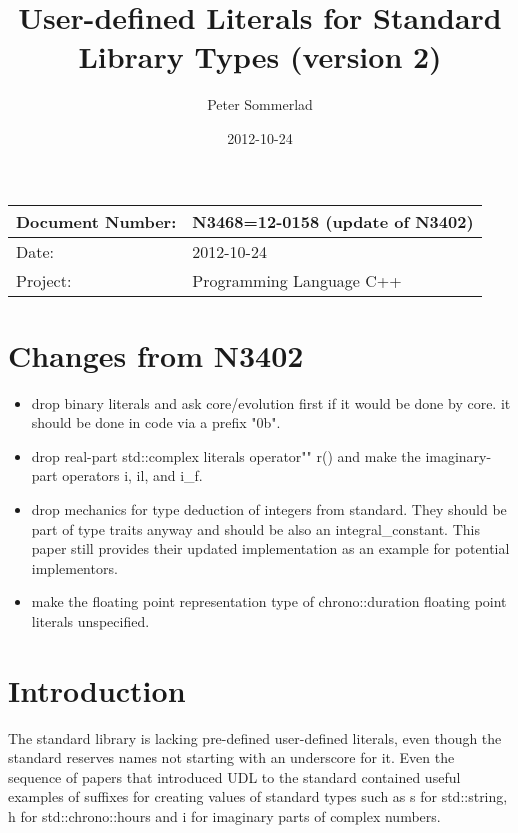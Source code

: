 \documentclass[ebook,11pt,article]{memoir}
\title{User-defined Literals for Standard Library Types (version 2)}
\author{Peter Sommerlad}
\date{2012-10-24}                                           %
\begin{document}
\maketitle
\begin{tabular}[t]{|l|l|}\hline 
Document Number: &  N3468=12-0158 (update of N3402)\\\hline
Date: & 2012-10-24 \\\hline
Project: & Programming Language C++\\\hline 
\end{tabular}

\chapter{Changes from N3402}
\begin{itemize}
\item drop binary literals and ask core/evolution first if it would be done by core. it should be done in code via a prefix "0b".
\item drop real-part std::complex literals operator"" r() and make the imaginary-part operators i, il, and i\_f.
\item drop mechanics for type deduction of integers from standard. They should be part of type traits anyway and should be also an integral\_constant. This paper still provides their updated implementation as an example for potential implementors.
\item make the floating point representation type of chrono::duration floating point literals unspecified.
\end{itemize}


\chapter{Introduction}
The standard library is lacking pre-defined user-defined literals, even though the standard reserves names not starting with an underscore for it. Even the sequence of papers that introduced UDL to the standard contained useful examples of suffixes for creating values of standard types such as s for std::string, h for std::chrono::hours and i for imaginary parts of complex numbers.
\end{document}
